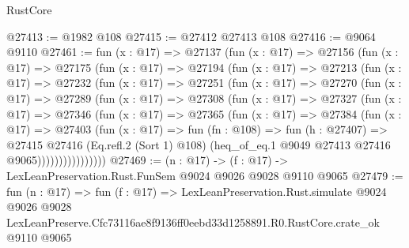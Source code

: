 \begin{lexlean}{RustCore}
\begin{coremodule}
@27413 := @1982 @108
@27415 := @27412 @27413 @108
@27416 := @9064 @9110
@27461 := fun (x : @17) =>
  @27137
    (fun (x : @17) =>
    @27156
      (fun (x : @17) =>
      @27175
        (fun (x : @17) =>
        @27194
          (fun (x : @17) =>
          @27213
            (fun (x : @17) =>
            @27232
              (fun (x : @17) =>
              @27251
                (fun (x : @17) =>
                @27270
                  (fun (x : @17) =>
                  @27289
                    (fun (x : @17) =>
                    @27308
                      (fun (x : @17) =>
                      @27327
                        (fun (x : @17) =>
                        @27346
                          (fun (x : @17) =>
                          @27365
                            (fun (x : @17) =>
                            @27384
                              (fun (x : @17) =>
                              @27403
                                (fun (x : @17) =>
                                fun (fn : @108) =>
                                fun (h : @27407) =>
                                @27415
                                  @27416
                                  (Eq.refl.{2} (Sort 1) @108)
                                  (heq_of_eq.{1} @9049 @27413 @27416 @9065))))))))))))))))
@27469 := (n : @17) -> (f : @17) -> LexLeanPreservation.Rust.FunSem @9024 @9026 @9028 @9110 @9065
@27479 := fun (n : @17) =>
  fun (f : @17) =>
  LexLeanPreservation.Rust.simulate
    @9024
    @9026
    @9028
    LexLeanPreserve.Cfc73116ae8f9136ff0eebd33d1258891.R0.RustCore.crate_ok
    @9110
    @9065
\end{coremodule}
\end{lexlean}
